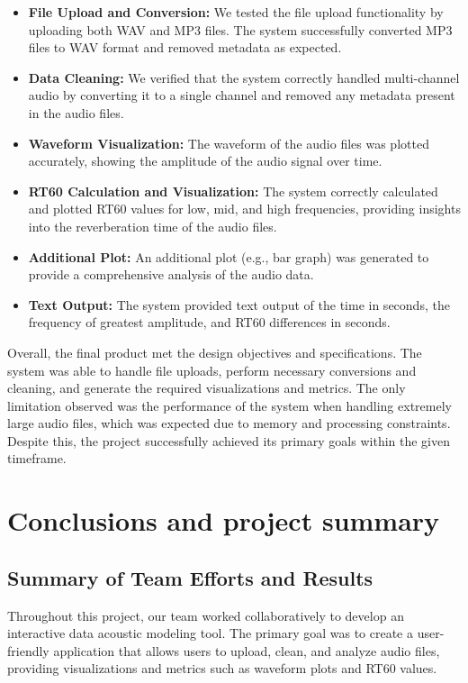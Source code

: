 \documentclass[11pt]{article}
\begin{document}
\begin{itemize}
    \item \textbf{File Upload and Conversion:} We tested the file upload functionality by uploading both WAV and MP3 files. The system successfully converted MP3 files to WAV format and removed metadata as expected.
    \item \textbf{Data Cleaning:} We verified that the system correctly handled multi-channel audio by converting it to a single channel and removed any metadata present in the audio files.
    \item \textbf{Waveform Visualization:} The waveform of the audio files was plotted accurately, showing the amplitude of the audio signal over time.
    \item \textbf{RT60 Calculation and Visualization:} The system correctly calculated and plotted RT60 values for low, mid, and high frequencies, providing insights into the reverberation time of the audio files.
    \item \textbf{Additional Plot:} An additional plot (e.g., bar graph) was generated to provide a comprehensive analysis of the audio data.
    \item \textbf{Text Output:} The system provided text output of the time in seconds, the frequency of greatest amplitude, and RT60 differences in seconds.
\end{itemize}

Overall, the final product met the design objectives and specifications. 
The system was able to handle file uploads, perform necessary conversions and 
cleaning, and generate the required visualizations and metrics. The only 
limitation observed was the performance of the system when handling extremely 
large audio files, which was expected due to memory and processing constraints. 
Despite this, the project successfully achieved its primary goals within the 
given timeframe.

\section{Conclusions and project summary}

\subsection{Summary of Team Efforts and Results}

Throughout this project, our team worked collaboratively to develop an interactive data acoustic modeling tool. The primary goal was to create a user-friendly application that allows users to upload, clean, and analyze audio files, providing visualizations and metrics such as waveform plots and RT60 values.
\end{document}
